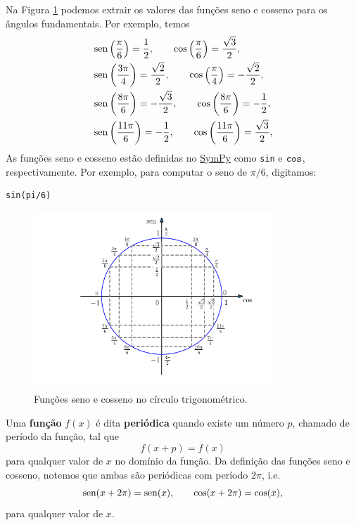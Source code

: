 Na Figura \ref{fig:cos_seno_valores} podemos extrair os valores das funções seno e cosseno para os ângulos fundamentais. Por exemplo, temos
\begin{align}
  &\operatorname{sen}\left(\frac{\pi}{6}\right) = \frac{1}{2},\qquad \cos\left(\frac{\pi}{6}\right) = \frac{\sqrt{3}}{2},\\
  &\operatorname{sen}\left(\frac{3\pi}{4}\right) = \frac{\sqrt{2}}{2},\qquad \cos\left(\frac{\pi}{4}\right) = -\frac{\sqrt{2}}{2},\\
  &\operatorname{sen}\left(\frac{8\pi}{6}\right) = -\frac{\sqrt{3}}{2},\qquad \cos\left(\frac{8\pi}{6}\right) = -\frac{1}{2},\\
  &\operatorname{sen}\left(\frac{11\pi}{6}\right) = -\frac{1}{2},\qquad \cos\left(\frac{11\pi}{6}\right) = \frac{\sqrt{3}}{2},\\
\end{align}
\ifispython
As funções seno e cosseno estão definidas no \href{https://www.sympy.org}{SymPy} como \verb+sin+ e $\verb+cos+$, respectivamente. Por exemplo, para computar o seno de $\pi/6$, digitamos:
\begin{verbatim}
sin(pi/6)
\end{verbatim}
\fi

\begin{figure}[H]
  \centering
  \includegraphics[width=0.8\textwidth]{./cap_funcao/dados/fig_cos_seno_valores/fig_cos_seno_valores}
  \caption{Funções seno e cosseno no círculo trigonométrico.}
  \label{fig:cos_seno_valores}
\end{figure}

Uma {\bf função} $f(x)$ é dita {\bf periódica} quando existe um número $p$, chamado de período da função, tal que
\begin{equation}
  f(x+p) = f(x)
\end{equation}
para qualquer valor de $x$ no domínio da função. Da definição das funções seno e cosseno, notemos que ambas são periódicas com período $2\pi$, i.e.
\begin{equation}
  \operatorname{sen}(x+2\pi) = \operatorname{sen}(x),\qquad \cos(x+2\pi) = \cos(x),
\end{equation}
para qualquer valor de $x$.

